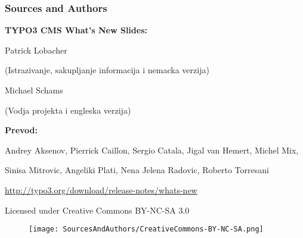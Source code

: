 \begin{frame}[fragile]
	\frametitle{Sources and Authors}

	\vspace{-0.6cm}

	\centerline{\textbf{TYPO3 CMS What's New Slides:}}

	\begin{center}
		\smaller
			\centerline{Patrick Lobacher}
			\centerline{(Istrazivanje, sakupljanje informacija i nemacka verzija)}
			\vspace{0.1cm}
			\centerline{Michael Schams}
			\centerline{(Vodja projekta i engleska verzija)}
		\normalsize
	\end{center}
	\vspace{-0.6cm}
	\begin{center}
		\smaller
			\centerline{\textbf{Prevod:}}
			\centerline{Andrey Aksenov, Pierrick Caillon, Sergio Catala, Jigal van Hemert, Michel Mix,}
			\centerline{Sinisa Mitrovic, Angeliki Plati, Nena Jelena Radovic, Roberto Torresani}
		\normalsize
	\end{center}
	\vspace{-0.6cm}
	\smaller\begin{center}\url{http://typo3.org/download/release-notes/whats-new}\end{center}\normalsize

	\smaller\begin{center}Licensed under Creative Commons BY-NC-SA 3.0\end{center}\normalsize
	\begin{figure}\vspace*{-0.3cm}
		\texttt{[image: SourcesAndAuthors/CreativeCommons-BY-NC-SA.png]}
	\end{figure}

\end{frame}


